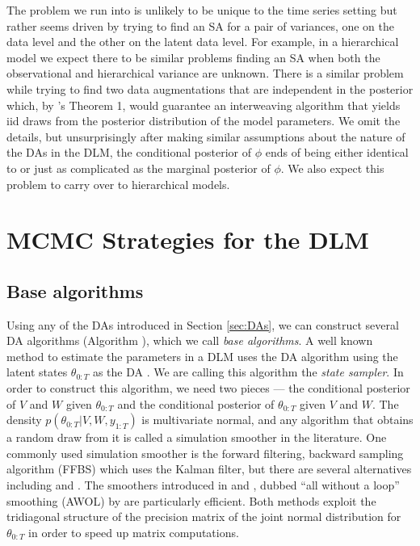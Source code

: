 \documentclass{article}
\begin{document}
The problem we run into is unlikely to be unique to the time series setting but rather seems driven by trying to find an SA for a pair of variances, one on the data level and the other on the latent data level. For example, in a hierarchical model we expect there to be similar problems finding an SA when both the observational and hierarchical variance are unknown. There is a similar problem while trying to find two data augmentations that are independent in the posterior which, by 's Theorem 1, would guarantee an interweaving algorithm that yields iid draws from the posterior distribution of the model parameters. We omit the details, but unsurprisingly after making similar assumptions about the nature of the DAs in the DLM, the conditional posterior of $\phi$ ends of being either identical to or just as complicated as the marginal posterior of $\phi$. We also expect this problem to carry over to hierarchical models.

\section{MCMC Strategies for the DLM}\label{sec:Algs}

\subsection{Base algorithms}\label{sec:Algs:base}
Using any of the DAs introduced in Section \ref{sec:DAs}, we can construct several DA algorithms (Algorithm ), which we call {\it base algorithms}. A well known method to estimate the parameters in a DLM uses the DA algorithm using the latent states $\theta_{0:T}$ as the DA \cite{fruhwirth1994data,carter1994gibbs}. We are calling this algorithm the {\it state sampler}. In order to construct this algorithm, we need two pieces --- the conditional posterior of $V$ and $W$ given $\theta_{0:T}$ and the conditional posterior of $\theta_{0:T}$ given $V$ and $W$. The density $p(\theta_{0:T}|V,W,y_{1:T})$ is multivariate normal, and any algorithm that obtains a random draw from it is called a simulation smoother in the literature. One commonly used simulation smoother is the forward filtering, backward sampling algorithm (FFBS) \cite{fruhwirth1994data,carter1994gibbs} which uses the Kalman filter, but there are several alternatives including  and . The smoothers introduced in  and , dubbed ``all without a loop'' smoothing (AWOL) by  are particularly efficient. Both methods exploit the tridiagonal structure of the precision matrix of the joint normal distribution for $\theta_{0:T}$ in order to speed up matrix computations. 
\end{document}
